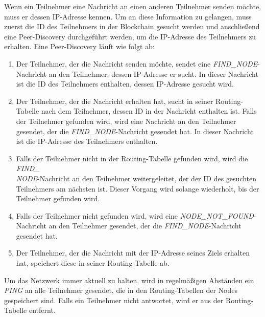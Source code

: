 Wenn ein Teilnehmer eine Nachricht an einen anderen Teilnehmer senden möchte, muss er dessen IP-Adresse kennen. Um an diese Information zu gelangen, muss zuerst die ID des Teilnehmers in der Blockchain gesucht werden und anschließend eine Peer-Discovery durchgeführt werden, um die IP-Adresse des Teilnehmers zu erhalten. Eine Peer-Discovery läuft wie folgt ab:

\begin{enumerate}
    \item Der Teilnehmer, der die Nachricht senden möchte, sendet eine \textit{FIND\_NODE}-Nachricht an den Teilnehmer, dessen IP-Adresse er sucht. In dieser Nachricht ist die ID des Teilnehmers enthalten, dessen IP-Adresse gesucht wird.
    \item Der Teilnehmer, der die Nachricht erhalten hat, sucht in seiner Routing-Tabelle nach dem Teilnehmer, dessen ID in der Nachricht enthalten ist. Falls der Teilnehmer gefunden wird, wird eine Nachricht an den Teilnehmer gesendet, der die \textit{FIND\_NODE}-Nachricht gesendet hat. In dieser Nachricht ist die IP-Adresse des Teilnehmers enthalten.
    \item Falls der Teilnehmer nicht in der Routing-Tabelle gefunden wird, wird die \textit{FIND\_\\NODE}-Nachricht an den Teilnehmer weitergeleitet, der der ID des gesuchten Teilnehmers am nächsten ist. Dieser Vorgang wird solange wiederholt, bis der Teilnehmer gefunden wird.
    \item Falls der Teilnehmer nicht gefunden wird, wird eine \textit{NODE\_NOT\_FOUND}-\\Nachricht an den Teilnehmer gesendet, der die \textit{FIND\_NODE}-Nachricht gesendet hat.
    \item Der Teilnehmer, der die Nachricht mit der IP-Adresse seines Ziels erhalten hat, speichert diese in seiner Routing-Tabelle ab.
\end{enumerate}

\noindent Um das Netzwerk immer aktuell zu halten, wird in regelmäßigen Abständen ein \textit{PING} an alle Teilnehmer gesendet, die in den Routing-Tabellen der Nodes gespeichert sind. Falls ein Teilnehmer nicht antwortet, wird er aus der Routing-Tabelle entfernt.
